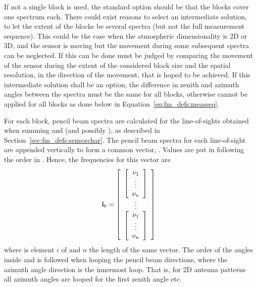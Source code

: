 If not a single block is used, the standard option should be that the
blocks cover one spectrum each. There could exist reasons to select an
intermediate solution, to let the extent of the blocks be several
spectra (but not the full measurement sequence). This could be the
case when the atmospheric dimensionality is 2D or 3D, and the sensor
is moving but the movement during some subsequent spectra can be
neglected. If this can be done must be judged by comparing the
movement of the sensor during the extent of the considered block size
and the spatial resolution, in the direction of the movement, that is
hoped to be achieved. If this intermediate solution shall be an
option, the difference in zenith and azimuth angles between the
spectra must be the same for all blocks, otherwise
 cannot be applied for all blocks as done
below in Equation~\ref{eq:fm_defs:measseq}.

For each block, pencil beam spectra are calculated for the
line-of-sights obtained when summing  and
 (and possibly
), as described in
Section~\ref{sec:fm_defs:sensorchar}. The pencil beam spectra for each
line-of-sight are appended vertically to form a common vector,
. Values are put in following the order in
. Hence, the frequencies for this vector are
\begin{equation}
  \mathbf{i}_{b} = 
  \left[ \begin{array}{c} 
     \left[
          \begin{array}{c} \nu_{1}\\\vdots\\\nu_{n} \end{array} 
     \right] \\
     \vdots \\
     \left[
          \begin{array}{c} \nu_{1}\\\vdots\\\nu_{n} \end{array} 
     \right]
     \end{array} \right]
  \label{eq:fm_defs:freqs_of_ib}
\end{equation}
where  is element $i$ of  and $n$ the length of
the same vector. The order of the angles inside 
and  is followed when looping the pencil beam
directions, where the azimuth angle direction is the innermost loop.
That is, for 2D antenna patterns all azimuth angles are looped for the
first zenith angle etc. 

